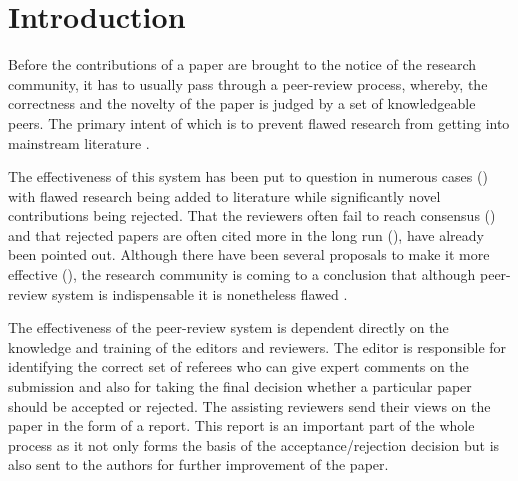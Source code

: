 \noindent
\section{Introduction}
\label{introduction}

Before the contributions of a paper are brought to the notice of the research community, it has to usually pass through a peer-review process, whereby, the correctness and the novelty of the paper is judged by a set of knowledgeable peers. The primary intent of which is to prevent flawed research from getting into mainstream literature \cite{kassirer1994peer}. 

The effectiveness of this system has been put to question in numerous cases (\cite{ingelfinger1974peer,relman1989good,smith2006peer}) with flawed research being added to literature while significantly novel contributions being rejected. That the reviewers often fail to reach consensus (\cite{cole1981chance}) and that rejected papers are often cited more in the long run (\cite{braatz2014papers}), have already been pointed out. Although there have been several proposals to make it more effective (\cite{caswellimproving,graffy2006improving,mcnutt1990effects}), 
the research community is coming to a conclusion that although peer-review system is indispensable it is nonetheless flawed \cite{bacchetti2002peer}. 

 The effectiveness of the peer-review system is dependent directly on the knowledge and training of the editors and reviewers. The editor is responsible for identifying the correct set of referees who can give expert comments on the submission and also for taking the final decision whether a particular paper should be accepted or rejected. The assisting reviewers send their views on the paper in the form of a report. This report is an important part of the whole process as it not only forms the basis of the acceptance/rejection decision but is also sent to the authors for further improvement of the paper.  

